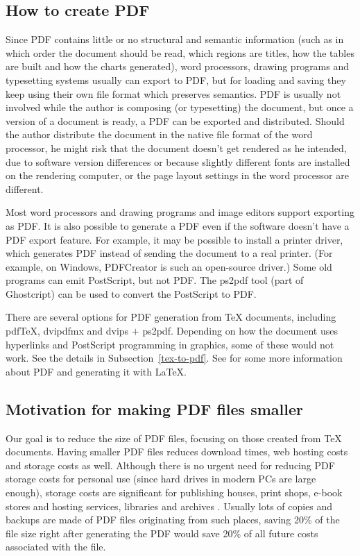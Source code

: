 \documentclass{ltugproc}
\def\cmd{\textsf}
\begin{document}
\subsection{How to create PDF}

Since PDF contains little or no structural and semantic information (such as
in which order the document should be read, which regions are titles, how
the tables are built and how the charts generated), word processors, drawing
programs and
typesetting systems usually can export to PDF, but for loading and saving
they keep using their own
file format which preserves semantics. PDF is usually not involved while the
author is composing (or typesetting) the document, but once a version of a
document is ready, a PDF can be exported and distributed. Should the author
distribute the document in the native file format of the word processor, he
might risk that the document doesn't get rendered as he intended, due to
software version differences or because slightly different fonts are
installed on the rendering computer, or the page layout settings in the word
processor are different.

Most word processors and drawing programs and image editors support
exporting as PDF. It is also possible to generate a PDF even if the software
doesn't have a PDF export feature. For example, it may be possible to
install a printer driver, which generates PDF instead of sending the
document to a real printer. (For example, on Windows, PDFCreator
\cite{pdfcreator} is such an open-source driver.) Some old programs can emit
PostScript, but not PDF. The \cmd{ps2pdf} \cite{ps2pdf} tool (part of
Ghostcript) can be used to convert the PostScript to PDF.

There are several options for PDF generation from
\TeX{} documents, including
pdf\TeX{}, \cmd{dvipdfmx} and \cmd{dvips} $+$ \cmd{ps2pdf}. Depending on how
the document uses hyperlinks and PostScript programming in graphics, some of
these would not work. See the details in Subsection~\ref{tex-to-pdf}. See
\cite{creative-pdf} for
some more information about PDF and generating it with \LaTeX{}.

\subsection{Motivation for making PDF files smaller}

Our goal is to reduce the size of PDF files, focusing on those
created from \TeX{} documents. Having smaller PDF files reduces download
times, web hosting costs and storage costs as well. Although there is no
urgent need for reducing PDF storage costs for personal use (since hard
drives in modern PCs are large enough), storage costs are significant for
publishing houses, print shops, e-book stores and hosting services,
libraries and archives \cite{multivalent-archive}.
Usually lots of copies and backups are made of PDF
files originating from such places, saving 20\% of the file size right after
generating the PDF would save 20\% of all future costs associated with the
file.
\end{document}

